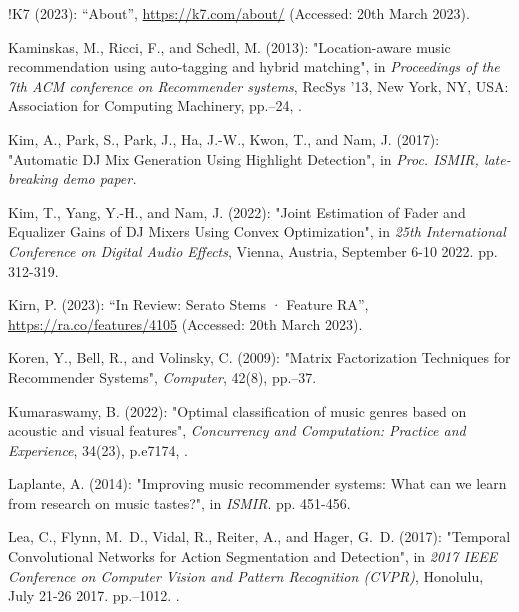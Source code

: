 \documentclass[11pt,titlepage,oneside]{book}
\begin{document}
\begin{thebibliography}{97}
	!K7 (2023): \enquote{About}, \urlprefix\url{https://k7.com/about/} (Accessed: 20th March 2023).
	
	Kaminskas, M., Ricci, F., and Schedl, M. (2013): "Location-aware music
		recommendation using auto-tagging and hybrid matching", in
	\textit{Proceedings of the 7th {ACM} conference on {Recommender} systems},
	{RecSys} '13, New York, NY, USA: Association for Computing Machinery,
	pp.--24, .
	
	Kim, A., Park, S., Park, J., Ha, J.-W., Kwon, T., and Nam, J. (2017):
	"Automatic {DJ} {Mix} {Generation} {Using} {Highlight} {Detection}", in \textit{Proc. ISMIR, late-breaking demo paper.}
	
	Kim, T., Yang, Y.-H., and Nam, J. (2022): "Joint {Estimation} of
		{Fader} and {Equalizer} {Gains} of {DJ} {Mixers} {Using} {Convex}
		{Optimization}", in \textit{25th International Conference on Digital Audio Effects}, Vienna, Austria, September 6-10 2022. pp. 312-319.
	
	Kirn, P. (2023): \enquote{In {Review}: {Serato} {Stems} · {Feature} {RA}},
	\urlprefix\url{https://ra.co/features/4105} (Accessed: 20th March 2023).
	
	Koren, Y., Bell, R., and Volinsky, C. (2009): "Matrix {Factorization}
		{Techniques} for {Recommender} {Systems}", \textit{Computer}, 42(8),
	pp.--37. 
	
	Kumaraswamy, B. (2022): "Optimal classification of music genres based
		on acoustic and visual features", \textit{Concurrency and Computation:
		Practice and Experience}, 34(23), p.\ignorespaces e7174,
	. 
	
	Laplante, A. (2014): "Improving music recommender systems: What can we learn from research on music tastes?", in \textit{ISMIR}. pp. 451-456.
	
	Lea, C., Flynn, M.~D., Vidal, R., Reiter, A., and Hager, G.~D. (2017):
	"Temporal {Convolutional} {Networks} for {Action} {Segmentation} and
		{Detection}", in \textit{2017 {IEEE} {Conference} on {Computer} {Vision} and
		{Pattern} {Recognition} ({CVPR})}, Honolulu, July 21-26 2017. pp.--1012. .
	

\end{thebibliography}
\end{document}
